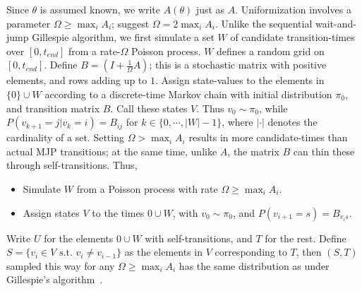 Since $\theta$ is assumed known, we write $A(\theta)$ just as $A$. 
Uniformization involves a parameter $\Omega \ge \max_i A_i$; \cite{RaoTeh13} suggest $\Omega = 2 \max_i A_i$. 
Unlike the sequential wait-and-jump Gillespie algorithm, we first simulate a set $W$ of candidate transition-times over $[0,t_{end}]$ from a rate-$\Omega$ Poisson process. 
$W$ defines a random grid on $[0,t_{end}]$.
Define $B = \left(I +\frac{1}{\Omega}A\right)$; this is a stochastic matrix with positive elements, and rows adding up to $1$.
Assign state-values to the elements in $\{0\} \cup W$ according to a discrete-time Markov chain with initial distribution $\pi_0$, and transition matrix $B$.
Call these states $V$. 
Thus $v_0 \sim \pi_0$, while $P(v_{k+1}=j|v_k=i) = B_{ij}$ for $k \in \{0,\cdots,|W|-1\}$, where $|\cdot|$ denotes the cardinality of a set.
Setting $\Omega > \max_i A_i$ results in more candidate-times than actual MJP transitions; at the same time, unlike $A$, the matrix $B$ can thin these through self-transitions. 
Thus,
\begin{itemize}
  \item Simulate $W$ from a Poisson process with rate $\Omega \ge \max_i A_i$.
  \item Assign states $V$ to the times $0 \cup W$, with $v_0 \sim \pi_0$, and $P(v_{i+1}=s) = B_{v_is}$.
\end{itemize}
Write $U$ for the elements $0 \cup W$ with self-transitions, and $T$ for the rest.
Define $S=\{v_i \in V \text{ s.t.\ } v_i \neq v_{i-1}\}$ as the elements in $V$ corresponding to $T$, then $(S,T)$ sampled this way for any $\Omega \ge \max_i A_i$
has the same distribution as under Gillespie's algorithm~\citep{Jen1953,RaoTeh13}. 

